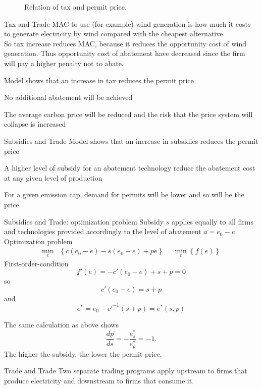 	\begin{center}
	\begin{figure}[h!]
	\centering
	\caption{Relation of tax and permit price.}
	\end{figure}
	\end{center}

Tax and Trade
	MAC to use (for example) wind generation is how much it costs to generate electricity by wind compared with the cheapest alternative. \\
	
	So tax increase reduces MAC, because it reduces the opportunity cost of wind generation. Thus opportunity cost 
	of abatement have decreased since the firm will pay a higher penalty not to abate.

	Model shows that an increase in tax reduces the permit price
	
	No additional abatement will be achieved
	
	The average carbon price will be reduced and the risk that the price system will collapse is increased


Subsidies and Trade
	Model shows that an increase in subsidies reduces the permit price
	
	A higher level of subsidy for an abatement technology reduce the abatement cost at any given level of production
	
	For a given emission cap, demand for permits will be lower and so will be the price.


Subsidies and Trade: optimization problem
Subsidy $s$ applies equally to all firms and technologies provided accordingly to the level of abatement $a = e_0 - e$ \\
	Optimization problem
		\begin{align}
		\min_{e} & \left\{c(e_0-e)-s(e_0-e)+pe\right\} = \min_{e}\left\{f(e)\right\}
		\end{align}
	First-order-condition
		\[
		f'(e)=-c'(e_0-e)+ s+p = 0
		\]
		so
		\[
		c'(e_0-e)=s+p
		\]
		and
		\[
		e^*=e_0-c'^{-1}(s+p)=e^*(s,p)
		\]
 
	The same calculation as above shows
		\[
		\frac{dp}{ds} = -\frac{e^*_s}{e^*_p}=-1.
		\]
	The higher the subsidy, the lower the permit price.


Trade and Trade
	Two separate trading programs apply upstream to firms that produce electricity and downstream to firms that consume it.
	
